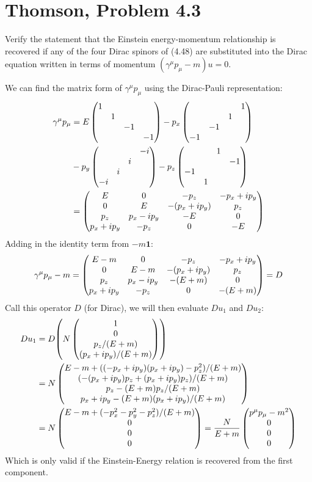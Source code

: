 \documentclass[12pt]{article}
\begin{document}
\section{Thomson, Problem 4.3}
\begin{problem}
  Verify the statement that the Einstein energy-momentum relationship is recovered if any of the four Dirac spinors of (4.48) are substituted into the Dirac equation written in terms of momentum $(\gamma^\mu p_\mu-m)u=0$.
\end{problem}
We can find the matrix form of $\gamma^\mu p_\mu$ using the Dirac-Pauli representation:
\begin{align*}
  \gamma^\mu p_\mu&=
  E\pmqty{\dmat{1,1,-1,-1}}
  -p_x\pmqty{\admat{1,1,-1,-1}}\\
  &-p_y\pmqty{\admat{-i,i,i,-i}}
  -p_z\pmqty{&&1\\&&&-1\\-1\\&1}\\
  &=\pmqty{
    E&0&-p_z&-p_x+ip_y\\
    0&E&-(p_x+ip_y)&p_z\\
    p_z&p_x-ip_y&-E&0\\
    p_x+ip_y&-p_z&0&-E
  }
\end{align*}
Adding in the identity term from $-m\bm{1}$:
\begin{align*}
  \gamma^\mu p_\mu-m=\pmqty{
    E-m&0&-p_z&-p_x+ip_y\\
    0&E-m&-(p_x+ip_y)&p_z\\
    p_z&p_x-ip_y&-(E+m)&0\\
    p_x+ip_y&-p_z&0&-(E+m)
  }=D
\end{align*}
Call this operator $D$ (for Dirac), we will then evaluate $D u_1$ and $D u_2$:
\begin{align*}
  D u_1&= D \qty(N\pmqty{1\\0\\p_z/(E+m)\\(p_x+ip_y)/(E+m)})\\
  &=N\pmqty{
    E-m+((-p_x+ip_y)(p_x+ip_y)-p_z^2)/(E+m)\\
    (-(p_x+ip_y)p_z+(p_x+ip_y)p_z)/(E+m)\\
    p_z-(E+m)p_z/(E+m)\\
    p_x+ip_y-(E+m)(p_x+ip_y)/(E+m)
  }\\
  &=N\pmqty{
    E-m+(-p_x^2-p_y^2-p_z^2)/(E+m)\\
    0\\ 0\\ 0
  }
  =\frac{N}{E+m}\pmqty{p^\mu p_\mu-m^2\\0\\0\\0}
\end{align*}
Which is only valid if the Einstein-Energy relation is recovered from the first component.
\end{document}
